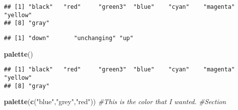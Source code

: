 \documentclass[]{article}
\newenvironment{Shaded}{\begin{snugshade}}{\end{snugshade}}
\newcommand{\KeywordTok}[1]{\textcolor[rgb]{0.13,0.29,0.53}{\textbf{#1}}}
\newcommand{\StringTok}[1]{\textcolor[rgb]{0.31,0.60,0.02}{#1}}
\newcommand{\CommentTok}[1]{\textcolor[rgb]{0.56,0.35,0.01}{\textit{#1}}}
\newcommand{\OperatorTok}[1]{\textcolor[rgb]{0.81,0.36,0.00}{\textbf{#1}}}
\newcommand{\NormalTok}[1]{#1}
\begin{document}
\begin{verbatim}
## [1] "black"   "red"     "green3"  "blue"    "cyan"    "magenta" "yellow" 
## [8] "gray"
\end{verbatim}

\begin{Shaded}
\end{Shaded}

\begin{verbatim}
## [1] "down"       "unchanging" "up"
\end{verbatim}

\begin{Shaded}
\begin{Highlighting}[]
\KeywordTok{palette}\NormalTok{()}
\end{Highlighting}
\end{Shaded}

\begin{verbatim}
## [1] "black"   "red"     "green3"  "blue"    "cyan"    "magenta" "yellow" 
## [8] "gray"
\end{verbatim}

\begin{Shaded}
\begin{Highlighting}[]
\KeywordTok{palette}\NormalTok{(}\KeywordTok{c}\NormalTok{(}\StringTok{"blue"}\NormalTok{,}\StringTok{"grey"}\NormalTok{,}\StringTok{"red"}\NormalTok{))}
\CommentTok{#This is the color that I wanted. }
\CommentTok{#Section}
\end{Highlighting}
\end{Shaded}
\end{document}
